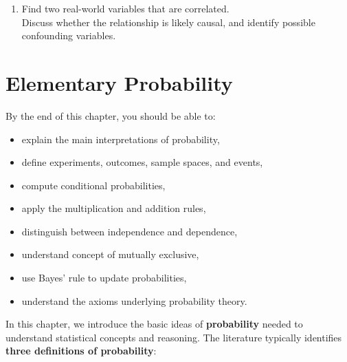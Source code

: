 \documentclass[
  letterpaper,
  DIV=11,
  numbers=noendperiod]{scrreprt}
\providecommand{\tightlist}{%
  \setlength{\itemsep}{0pt}\setlength{\parskip}{0pt}}
\begin{document}
\begin{enumerate}
\def\labelenumi{\arabic{enumi}.}
\setcounter{enumi}{9}
\tightlist
\item
  Find two real-world variables that are correlated.\\
  Discuss whether the relationship is likely causal, and identify
  possible confounding variables.
\end{enumerate}


\chapter{Elementary Probability}\label{ch7}

\begin{tcolorbox}[enhanced jigsaw, coltitle=black, colbacktitle=quarto-callout-note-color!10!white, left=2mm, bottomrule=.15mm, bottomtitle=1mm, colback=white, titlerule=0mm, colframe=quarto-callout-note-color-frame, breakable, leftrule=.75mm, toptitle=1mm, opacitybacktitle=0.6, rightrule=.15mm, title=\textcolor{quarto-callout-note-color}{\faInfo}\hspace{0.5em}{Learning objectives}, arc=.35mm, opacityback=0, toprule=.15mm]

By the end of this chapter, you should be able to:

\begin{itemize}
\tightlist
\item
  explain the main interpretations of probability,
\item
  define experiments, outcomes, sample spaces, and events,
\item
  compute conditional probabilities,
\item
  apply the multiplication and addition rules,
\item
  distinguish between independence and dependence,
\item
  understand concept of mutually exclusive,
\item
  use Bayes' rule to update probabilities,
\item
  understand the axioms underlying probability theory.
\end{itemize}

\end{tcolorbox}

In this chapter, we introduce the basic ideas of \textbf{probability}
needed to understand statistical concepts and reasoning. The literature
typically identifies \textbf{three definitions of probability}:
\end{document}
